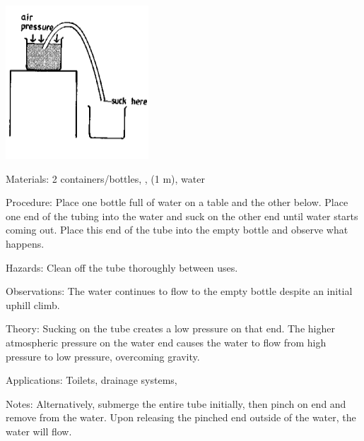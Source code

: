 \begin{multicols}{2}
\begin{center}
\includegraphics[width=0.4\textwidth]{./img/source/siphon.png}
\end{center}

\begin{description*}
\item[Materials:]{2 containers/bottles, , (1 m), water}
\item[Procedure:]{Place one bottle full of water on a table and the other below. Place one end of the tubing into the water and suck on the other end until water starts coming out. Place this end of the tube into the empty bottle and observe what happens.}
\item[Hazards:]{Clean off the tube thoroughly between uses.}
\item[Observations:]{The water continues to flow to the empty bottle despite an initial uphill climb.}
\item[Theory:]{Sucking on the tube creates a low pressure on that end. The higher atmospheric pressure on the water end causes the water to flow from high pressure to low pressure, overcoming gravity.}
\item[Applications:]{Toilets, drainage systems, }
\item[Notes:]{Alternatively, submerge the entire tube initially, then pinch on end and remove from the water. Upon releasing the pinched end outside of the water, the water will flow.}
\end{description*}


\end{multicols}
